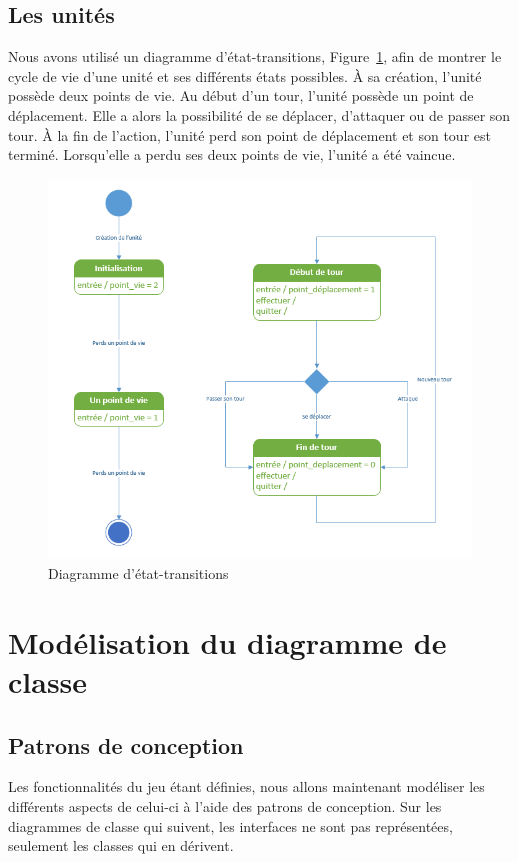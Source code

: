 \documentclass[a4paper]{article}%
\begin{document}
\subsection{Les unités}
Nous avons utilisé un diagramme d'état-transitions, Figure~\ref{fig:trans_unite}, afin de montrer le cycle de vie d'une unité et ses différents états possibles.
\`A sa création, l'unité possède deux points de vie. 
Au début d'un tour, l'unité possède un point de déplacement. Elle a alors la possibilité de se déplacer, d'attaquer ou de passer son tour. \`A la fin de l'action, l'unité perd son point de déplacement et son tour est terminé.
Lorsqu'elle a perdu ses deux points de vie, l'unité a été vaincue.

\begin{figure}[H]
    \centering
    \includegraphics[width=\textwidth]{./images/etat_transitions/cycle_unite.png}
		\caption{Diagramme d'état-transitions }
		\label{fig:trans_unite}
\end{figure}


\section{Modélisation du diagramme de classe}

\subsection{Patrons de conception}
Les fonctionnalités du jeu étant définies, nous allons maintenant modéliser les différents aspects de celui-ci à l'aide des patrons de conception. Sur les diagrammes de classe qui suivent, les interfaces ne sont pas représentées, seulement les classes qui en dérivent.
\end{document}
